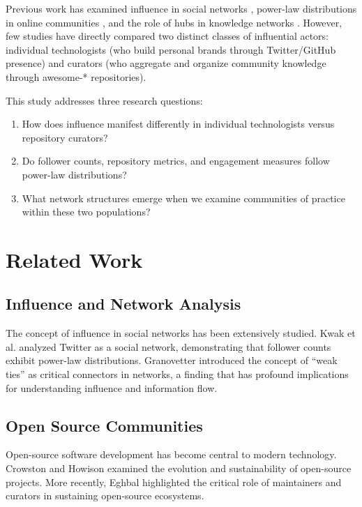 \documentclass[11pt]{article}
\begin{document}
Previous work has examined influence in social networks \cite{newman2018networks}, power-law distributions in online communities \cite{barabasi2009scale}, and the role of hubs in knowledge networks \cite{watts1998collective}. However, few studies have directly compared two distinct classes of influential actors: individual technologists (who build personal brands through Twitter/GitHub presence) and curators (who aggregate and organize community knowledge through awesome-* repositories).

This study addresses three research questions:

\begin{enumerate}
    \item How does influence manifest differently in individual technologists versus repository curators?
    \item Do follower counts, repository metrics, and engagement measures follow power-law distributions?
    \item What network structures emerge when we examine communities of practice within these two populations?
\end{enumerate}

\section{Related Work}

\subsection{Influence and Network Analysis}

The concept of influence in social networks has been extensively studied. Kwak et al. \cite{kwak2010} analyzed Twitter as a social network, demonstrating that follower counts exhibit power-law distributions. Granovetter \cite{granovetter1973} introduced the concept of ``weak ties'' as critical connectors in networks, a finding that has profound implications for understanding influence and information flow.

\subsection{Open Source Communities}

Open-source software development has become central to modern technology. Crowston and Howison \cite{crowston2006} examined the evolution and sustainability of open-source projects. More recently, Eghbal \cite{eghbal2016} highlighted the critical role of maintainers and curators in sustaining open-source ecosystems.
\end{document}
